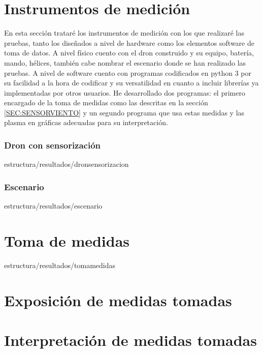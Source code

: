 
\section{Instrumentos de medición\label{SEC:INSTR}}
	En esta sección trataré los instrumentos de medición con los que realizaré las pruebas, tanto los diseñados a nivel de hardware como los elementos software de toma de datos. 
	A nivel físico cuento con el dron construido y su equipo, batería, mando, hélices, también cabe nombrar el escenario donde se han realizado las pruebas. A nivel de software cuento con programas codificados en python 3 por su facilidad a la hora de codificar y su versatilidad en cuanto a incluir librerías ya implementadas por otros usuarios. He desarrollado dos programas: el primero encargado de la toma de medidas como las descritas en la sección \ref{SEC:SENSORVIENTO} y un segundo programa que usa estas medidas y las plasma en gráficas adecuadas para su interpretación.
	
	\subsubsection{Dron con sensorización\label{SS:DRONSENS}}{estructura/resultados/dronsensorizacion}
	\subsubsection{Escenario\label{SS:ESCENARIO}}{estructura/resultados/escenario}
\section{Toma de medidas\label{SEC:TOMAMEDIDAS}}{estructura/resultados/tomamedidas}
\section{Exposición de medidas tomadas\label{SEC:EXPOSICION}}

\section{Interpretación de medidas tomadas\label{SEC:INTR}}
